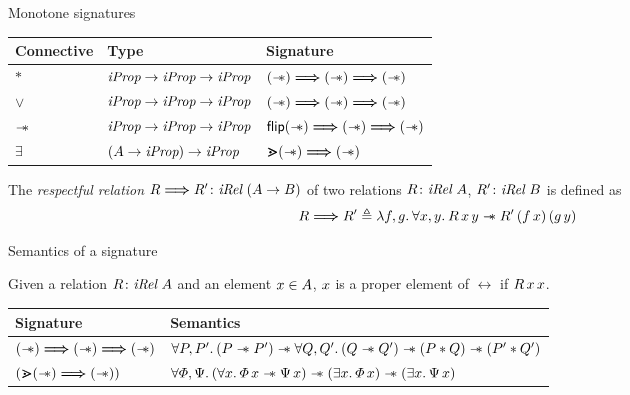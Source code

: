 \documentclass[aspectratio=169]{beamer}
\begin{document}
\begin{frame}{Monotone signatures}
    \begin{table}
        \begin{tabular}{lll}
            Connective & Type                           & Signature                                           \\
            \hline
            $*$        & $\textit{iProp} \to \textit{iProp} \to \textit{iProp}$    & $(\mathrel{-\!\!\ast}) \mathrel{\bm{\Longrightarrow}} (\mathrel{-\!\!\ast}) \mathrel{\bm{\Longrightarrow}} (\mathrel{-\!\!\ast})$      \\
            $\lor$     & $\textit{iProp} \to \textit{iProp} \to \textit{iProp}$    & $(\mathrel{-\!\!\ast}) \mathrel{\bm{\Longrightarrow}} (\mathrel{-\!\!\ast}) \mathrel{\bm{\Longrightarrow}} (\mathrel{-\!\!\ast})$      \\
            $\mathrel{-\!\!\ast}$    & $\textit{iProp} \to \textit{iProp} \to \textit{iProp}$    & $\textsf{\upshape flip}(\mathrel{-\!\!\ast}) \mathrel{\bm{\Longrightarrow}} (\mathrel{-\!\!\ast}) \mathrel{\bm{\Longrightarrow}} (\mathrel{-\!\!\ast})$ \\
            $\exists$  & $(A \to \textit{iProp}) \to \textit{iProp}$ & $\bm{\gtrdot}(\mathrel{-\!\!\ast}) \mathrel{\bm{\Longrightarrow}} (\mathrel{-\!\!\ast})$
        \end{tabular}
    \end{table}
    \pause
    \begin{definition}
        The \emph{respectful relation} $R \mathrel{\bm{\Longrightarrow}} R'\colon \textit{iRel}\ (A\to B)$ of two relations $\rel\colon\Rel\ \sigax$, $R'\colon\textit{iRel}\ B$ is defined as
        \begin{align*}
            \rel \respect \rel' \eqdef \Lam \func, \funcB. \All \var,\varB. \rel\, \var\, \varB \wand \rel'\, (\func\, \var)\, (\funcB\, \varB)
        \end{align*}
    \end{definition}
\end{frame}

\begin{frame}{Semantics of a signature}
    \begin{definition}
        Given a relation $\rel\colon\Rel\ \sigax$ and an element $x\in A$, $x$ is a proper element of $\rel$ if $R\, x\, x$.
    \end{definition}
    \vspace*{1cm}
    \pause
    \begin{tabular}{ll}
        Signature                                       & Semantics                                                                                                                                     \\
        \hline
        $(\mathrel{-\!\!\ast}) \mathrel{\bm{\Longrightarrow}} (\mathrel{-\!\!\ast}) \mathrel{\bm{\Longrightarrow}} (\mathrel{-\!\!\ast})$  & $\All \prop, \prop'. (\prop \wand \prop') \wand \All \propB, \propB'. (\propB \wand \propB') \wand (\prop * \propB) \wand (\prop' * \propB')$ \\\pause
        $\left(\bm{\gtrdot}(\mathrel{-\!\!\ast}) \mathrel{\bm{\Longrightarrow}} (\mathrel{-\!\!\ast})\right)$ & $\All \pred, \predB. (\All \var. \pred\, \var \wand \predB\, \var) \wand (\Exists \var. \pred\, \var) \wand (\Exists \var. \predB\, \var)$    \\
    \end{tabular}
\end{frame}
\end{document}
